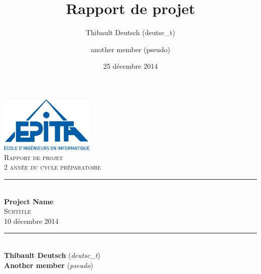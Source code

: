 \documentclass[11pt]{report}
\title{Rapport de projet}
\author{Thibault Deutsch (deutsc\_t) \and another member (pseudo)}
\date{25 décembre 2014}
\begin{document}
\renewcommand{\labelitemi}{$\bullet$}

\begin{titlepage}
\newcommand{\HRule}{\rule{\linewidth}{0.5mm}} %

\flushright
\includegraphics[width = 4.5cm]{epita.png}\\[0.5cm] %

\textsc{\Large Rapport de projet}\\[0.15cm] %
\textsc{\large 2 année du cycle préparatoire}\\[3cm] %

\center
\HRule \\[0.5cm]
{\Huge \bfseries Project Name}\\[0.3cm] %
\textsc{\Large Subtitle}\\[0.1cm] %
\large 10 décembre 2014\\[0.1cm] %
\HRule \\[3cm]

\Large
\textbf{Thibault Deutsch} (\emph{deutsc\_t}) \\
\textbf{Another member} (\emph{pseudo})\\[2cm]

\vfill %

\end{titlepage}
\end{document}
